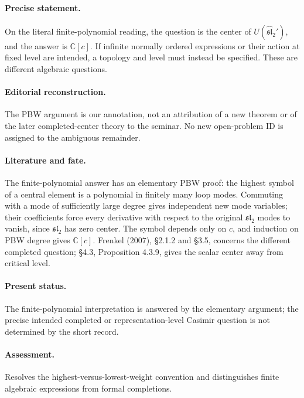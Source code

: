 \paragraph{Precise statement.} On the literal finite-polynomial reading, the question is the center of \(U(\widehat{\mathfrak{sl}}_2')\), and the answer is \(\mathbb C[c]\). If infinite normally ordered expressions or their action at fixed level are intended, a topology and level must instead be specified. These are different algebraic questions.

\paragraph{Editorial reconstruction.} The PBW argument is our annotation, not an attribution of a new theorem or of the later completed-center theory to the seminar. No new open-problem ID is assigned to the ambiguous remainder.

\paragraph{Literature and fate.} The finite-polynomial answer has an elementary PBW proof: the highest symbol of a central element is a polynomial in finitely many loop modes. Commuting with a mode of sufficiently large degree gives independent new mode variables; their coefficients force every derivative with respect to the original \(\mathfrak{sl}_2\) modes to vanish, since \(\mathfrak{sl}_2\) has zero center. The symbol depends only on \(c\), and induction on PBW degree gives \(\mathbb C[c]\). Frenkel (2007), \S2.1.2 and \S3.5, concerns the different completed question; \S4.3, Proposition 4.3.9, gives the scalar center away from critical level.

\paragraph{Present status.} The finite-polynomial interpretation is answered by the elementary argument; the precise intended completed or representation-level Casimir question is not determined by the short record.

\paragraph{Assessment.} Resolves the highest-versus-lowest-weight convention and distinguishes finite algebraic expressions from formal completions.

